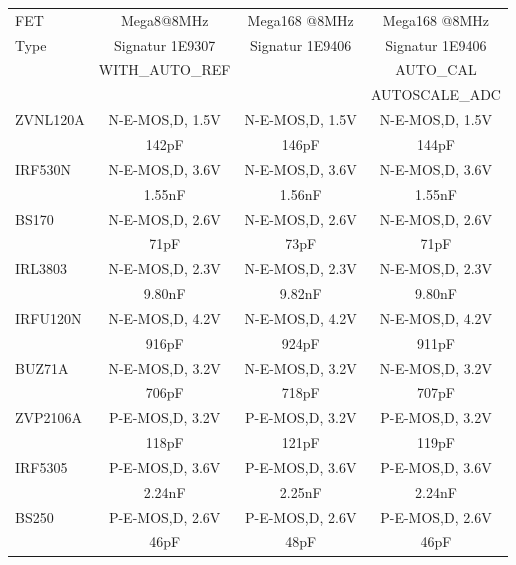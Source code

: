 \begin{table}[H]
  \begin{center}
    \begin{tabular}{| l | c | c | c |}
    \hline
     FET     & Mega8@8MHz       & Mega168 @8MHz    & Mega168 @8MHz \\
    Type     & Signatur 1E9307  & Signatur 1E9406  & Signatur 1E9406 \\
             & WITH\_AUTO\_REF  &                  & AUTO\_CAL \\
             &                  &                  & AUTOSCALE\_ADC \\
    \hline
    \hline
ZVNL120A     & N-E-MOS,D, 1.5V  & N-E-MOS,D, 1.5V  & N-E-MOS,D, 1.5V \\
             & 142pF            & 146pF            & 144pF \\
    \hline
IRF530N      & N-E-MOS,D, 3.6V  & N-E-MOS,D, 3.6V  & N-E-MOS,D, 3.6V \\
             & 1.55nF           & 1.56nF           & 1.55nF \\
    \hline
BS170        & N-E-MOS,D, 2.6V  & N-E-MOS,D, 2.6V  & N-E-MOS,D, 2.6V \\
             &  71pF            &  73pF            &  71pF \\
    \hline
IRL3803      & N-E-MOS,D, 2.3V  & N-E-MOS,D, 2.3V  & N-E-MOS,D, 2.3V \\
             & 9.80nF           & 9.82nF           & 9.80nF \\
    \hline
IRFU120N     & N-E-MOS,D, 4.2V  & N-E-MOS,D, 4.2V  & N-E-MOS,D, 4.2V \\
             & 916pF            & 924pF            & 911pF \\
    \hline
BUZ71A       & N-E-MOS,D, 3.2V  & N-E-MOS,D, 3.2V  & N-E-MOS,D, 3.2V \\
             & 706pF            & 718pF            & 707pF \\
    \hline
ZVP2106A     & P-E-MOS,D, 3.2V  & P-E-MOS,D, 3.2V  & P-E-MOS,D, 3.2V \\
             & 118pF            & 121pF            & 119pF \\
    \hline
IRF5305      & P-E-MOS,D, 3.6V  & P-E-MOS,D, 3.6V  & P-E-MOS,D, 3.6V \\
             & 2.24nF           & 2.25nF           & 2.24nF \\
    \hline
BS250        & P-E-MOS,D, 2.6V  & P-E-MOS,D, 2.6V  & P-E-MOS,D, 2.6V \\
             & 46pF             & 48pF             & 46pF \\

\end{tabular}
\end{center}
\end{table}
